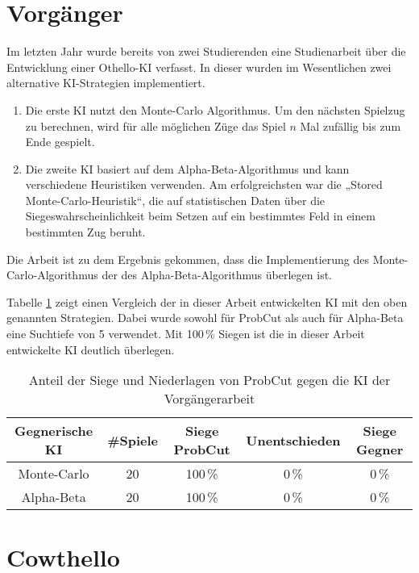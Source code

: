 
\section{Vorgänger}
Im letzten Jahr wurde bereits von zwei Studierenden eine Studienarbeit über die Entwicklung einer Othello-\ac{KI} verfasst.
In dieser wurden im Wesentlichen zwei alternative \ac{KI}-Strategien implementiert.
\begin{enumerate}
    \item Die erste \ac{KI} nutzt den Monte-Carlo Algorithmus. Um den nächsten Spielzug zu berechnen, wird für alle möglichen
    Züge das Spiel $n$ Mal zufällig bis zum Ende gespielt.
    \cite[S.~19]{othellostudienarbeit}
    \item Die zweite \ac{KI} basiert auf dem Alpha-Beta-Algorithmus und kann verschiedene Heuristiken verwenden. Am
    erfolgreichsten war die „Stored Monte-Carlo-Heuristik“, die auf statistischen Daten über die
    Siegeswahrscheinlichkeit beim Setzen auf ein bestimmtes Feld in einem bestimmten Zug beruht.
    \cite[S.~30]{othellostudienarbeit}
\end{enumerate}
Die Arbeit ist zu dem Ergebnis gekommen, dass die Implementierung des Monte-Carlo-Algorithmus der des
Alpha-Beta-Algorithmus überlegen ist.
\cite[S.~55]{othellostudienarbeit}

Tabelle \ref{table:comp:previous} zeigt einen Vergleich der in dieser Arbeit entwickelten \ac{KI} mit den oben genannten
Strategien. Dabei wurde sowohl für ProbCut als auch für Alpha-Beta eine Suchtiefe von 5 verwendet. Mit 100\,\% Siegen
ist die in dieser Arbeit entwickelte \ac{KI} deutlich überlegen.

\begin{table}[H]
\centering
\begin{tabular}{c|c|ccc}
\hline
Gegnerische \ac{KI} & \#Spiele & Siege ProbCut & Unentschieden & Siege Gegner \\
\hline
Monte-Carlo & 20 & 100\,\% & 0\,\% & 0\,\% \\
Alpha-Beta  & 20 & 100\,\% & 0\,\% & 0\,\% \\
\hline
\end{tabular}
\caption{Anteil der Siege und Niederlagen von ProbCut gegen die \ac{KI} der Vorgängerarbeit}
\label{table:comp:previous}
\end{table}

\section{Cowthello}

